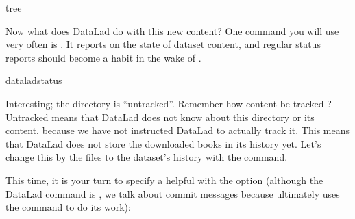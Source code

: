 \begin{sphinxVerbatim}[commandchars=\\\{\}]
tree

\end{sphinxVerbatim}

\ignorespaces 
\sphinxAtStartPar
Now what does DataLad do with this new content? One command you will use very
often is .
It reports on the state of dataset content, and
regular status reports should become a habit in the wake of .

\begin{sphinxVerbatim}[commandchars=\\\{\}]
dataladstatus
\end{sphinxVerbatim}

\ignorespaces 
\sphinxAtStartPar
Interesting; the  directory is “untracked”. Remember how content
 be tracked ?
Untracked means that DataLad does not know about this directory or its content,
because we have not instructed DataLad to actually track it. This means that DataLad
does not store the downloaded books in its history yet. Let’s change this by
 the files to the dataset’s history with the  command.

\sphinxAtStartPar
This time, it is your turn to specify a helpful {\hyperref[\detokenize{glossary:term-commit-message}]{}}
with the  option (although the DataLad command is , we talk
about commit messages because  ultimately uses the command
 to do its work):

